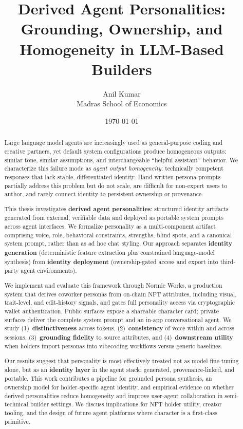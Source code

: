 \documentclass[12pt,letterpaper]{article}
\title{Derived Agent Personalities: Grounding, Ownership, and Homogeneity in LLM-Based Builders}
\author{Anil Kumar\\Madras School of Economics}
\date{\today}
\begin{document}
\maketitle

\begin{abstract}
\noindent
Large language model agents are increasingly used as general-purpose coding and creative partners, yet default system configurations produce homogeneous outputs: similar tone, similar assumptions, and interchangeable ``helpful assistant'' behavior.
We characterize this failure mode as \emph{agent output homogeneity}: technically competent responses that lack stable, differentiated identity.
Hand-written persona prompts partially address this problem but do not scale, are difficult for non-expert users to author, and rarely connect identity to persistent ownership or provenance.

This thesis investigates \textbf{derived agent personalities}: structured identity artifacts generated from external, verifiable data and deployed as portable system prompts across agent interfaces.
We formalize personality as a multi-component artifact comprising voice, role, behavioral constraints, strengths, blind spots, and a canonical system prompt, rather than as ad hoc chat styling.
Our approach separates \textbf{identity generation} (deterministic feature extraction plus constrained language-model synthesis) from \textbf{identity deployment} (ownership-gated access and export into third-party agent environments).

We implement and evaluate this framework through Normie Works, a production system that derives coworker personas from on-chain NFT attributes, including visual, trait-level, and edit-history signals, and gates full personality access via cryptographic wallet authentication.
Public surfaces expose a shareable character card; private surfaces deliver the complete system prompt and an in-app conversational agent.
We study (1)~\textbf{distinctiveness} across tokens, (2)~\textbf{consistency} of voice within and across sessions, (3)~\textbf{grounding fidelity} to source attributes, and (4)~\textbf{downstream utility} when holders import personas into vibecoding workflows versus generic baselines.

Our results suggest that personality is most effectively treated not as model fine-tuning alone, but as an \textbf{identity layer} in the agent stack: generated, provenance-linked, and portable.
This work contributes a pipeline for grounded persona synthesis, an ownership model for holder-specific agent identity, and empirical evidence on whether derived personalities reduce homogeneity and improve user-agent collaboration in semi-technical builder settings.
We discuss implications for NFT holder utility, creator tooling, and the design of future agent platforms where character is a first-class primitive.
\end{abstract}
\end{document}
